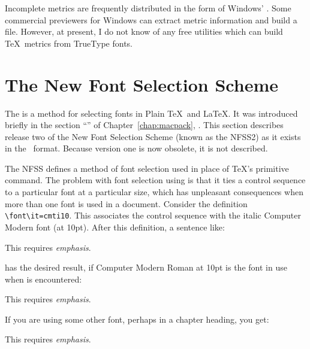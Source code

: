 \begin{iplist}{.25in}

  Incomplete metrics are frequently
  distributed in the form
  of Windows' .  Some commercial previewers
  for Windows can extract metric information and build a  file.
  However, at present, I do not know of any free utilities which can
  build \TeX\ metrics from TrueType fonts. 
\end{iplist}

\section{The New Font Selection Scheme}
\label{sec:nfss2}

The  is a method 
for selecting fonts in Plain
\TeX\ and \LaTeX.  It was introduced briefly in the section
``'' of Chapter~\ref{chap:macpack},
{\it{}}.  This section describes release two of the New
Font Selection Scheme (known as the 
NFSS2)
as it exists in the \LaTeXe\
format.  Because version one
is now obsolete, it is not described. 

The NFSS defines a method of font selection used in place of \TeX's primitive
 command.  The problem with font selection
using \cs{font} is that it ties a control sequence to a particular font at
a particular size, which has unpleasant consequences when more than one font
is used in a document.  Consider the definition \verb|\font\it=cmti10|.  This
associates the control sequence \cs{it} with the italic Computer Modern
font (at 10pt).  After this definition, a sentence like:

\begin{shortexample}
This requires {\it emphasis}.
\end{shortexample}

has the desired result, if Computer Modern Roman at 10pt is the font in
use when \cs{it} is encountered:

\begin{exindent}
\selectfont
This requires {\it emphasis}.
\end{exindent}

If you are using some other font, perhaps in a chapter heading, you get:

\begin{exindent}
\fontsize{14}{16pt}\selectfont
This requires {\fontfamily{cmr}\fontsize{10}{12pt}\selectfont
\it emphasis}.
\end{exindent}

